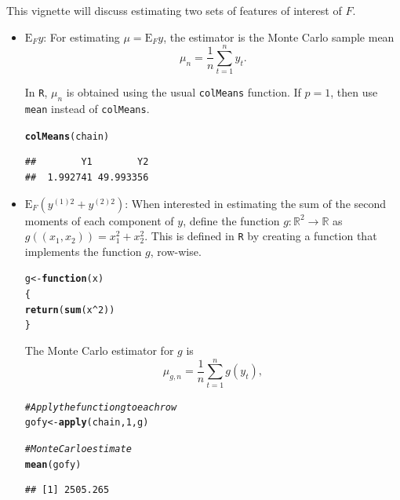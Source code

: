 \documentclass[11pt]{article}\usepackage[]{graphicx}\usepackage[]{color}
\makeatletter
\newcommand{\hlnum}[1]{\textcolor[rgb]{0.686,0.059,0.569}{#1}}%
\newcommand{\hlcom}[1]{\textcolor[rgb]{0.678,0.584,0.686}{\textit{#1}}}%
\newcommand{\hlopt}[1]{\textcolor[rgb]{0,0,0}{#1}}%
\newcommand{\hlstd}[1]{\textcolor[rgb]{0.345,0.345,0.345}{#1}}%
\newcommand{\hlkwa}[1]{\textcolor[rgb]{0.161,0.373,0.58}{\textbf{#1}}}%
\newcommand{\hlkwb}[1]{\textcolor[rgb]{0.69,0.353,0.396}{#1}}%
\newcommand{\hlkwc}[1]{\textcolor[rgb]{0.333,0.667,0.333}{#1}}%
\newcommand{\hlkwd}[1]{\textcolor[rgb]{0.737,0.353,0.396}{\textbf{#1}}}%
\newenvironment{kframe}{%
 \def\at@end@of@kframe{}%
 \ifinner\ifhmode%
  \def\at@end@of@kframe{\end{minipage}}%
  \begin{minipage}{\columnwidth}%
 \fi\fi%
 \def\FrameCommand##1{\hskip\@totalleftmargin \hskip-\fboxsep
 \colorbox{shadecolor}{##1}\hskip-\fboxsep
     \hskip-\linewidth \hskip-\@totalleftmargin \hskip\columnwidth}%
 \MakeFramed {\advance\hsize-\width
   \@totalleftmargin\z@ \linewidth\hsize
   \@setminipage}}%
 {\par\unskip\endMakeFramed%
 \at@end@of@kframe}
\newenvironment{knitrout}{}{} %
\makeatother
\begin{document}
\bigskip
This vignette will discuss estimating two sets of features of interest of $F$.
\begin{itemize}
\item $\text{E}_F y$: For estimating $\mu = \text{E}_Fy$, the estimator is the Monte Carlo sample mean
\[ \mu_n = \dfrac{1}{n} \displaystyle \sum_{t=1}^{n} y_t.\]

In \texttt{R}, $\mu_n$ is obtained using the usual \texttt{colMeans} function. If $p = 1$, then use \texttt{mean} instead of \texttt{colMeans}.

\begin{knitrout}
\color{fgcolor}\begin{kframe}
\begin{alltt}
\hlkwd{colMeans}\hlstd{(chain)}
\end{alltt}
\begin{verbatim}
##        Y1        Y2 
##  1.992741 49.993356
\end{verbatim}
\end{kframe}
\end{knitrout}
  
\item $\text{E}_F \left(y^{(1)2} + y^{(2)2} \right)$: When interested in estimating the sum of the second moments of each component of $y$,  define the function $g: \mathbb{R}^2 \to \mathbb{R}$ as $g((x_1,x_2)) = x_1^2 + x_2^2$. This is defined in \texttt{R} by creating a function that implements the function $g$, row-wise.

\begin{knitrout}
\color{fgcolor}\begin{kframe}
\begin{alltt}
\hlstd{g} \hlkwb{<-} \hlkwa{function}\hlstd{(}\hlkwc{x}\hlstd{)}
\hlstd{\{}
  \hlkwd{return}\hlstd{(}\hlkwd{sum}\hlstd{(x}\hlopt{^}\hlnum{2}\hlstd{))}
\hlstd{\}}
\end{alltt}
\end{kframe}
\end{knitrout}

The Monte Carlo estimator for $g$ is 
\[ \mu_{g,n} = \dfrac{1}{n} \displaystyle \sum_{t=1}^{n} g(y_t),\]

\begin{knitrout}
\color{fgcolor}\begin{kframe}
\begin{alltt}
\hlcom{# Apply the function g to each row}
\hlstd{gofy} \hlkwb{<-} \hlkwd{apply}\hlstd{(chain,} \hlnum{1}\hlstd{, g)}

\hlcom{# Monte Carlo estimate}
\hlkwd{mean}\hlstd{(gofy)}
\end{alltt}
\begin{verbatim}
## [1] 2505.265
\end{verbatim}
\end{kframe}
\end{knitrout}
\end{itemize}
\end{document}
